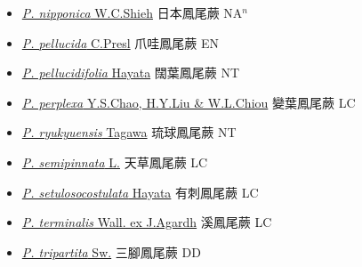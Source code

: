 \begin{itemize}
\begin{itemize}
        \item[] \href{http://www.theplantlist.org/tpl1.1/search?q=Pteris+nipponica}{\textit{P. nipponica} W.C.Shieh}   日本鳳尾蕨 NA$^n$
        \item[] \href{http://www.theplantlist.org/tpl1.1/search?q=Pteris+pellucida}{\textit{P. pellucida} C.Presl}     爪哇鳳尾蕨 EN
        \item[] \href{http://www.theplantlist.org/tpl1.1/search?q=Pteris+pellucidifolia}{\textit{P. pellucidifolia} Hayata}   闊葉鳳尾蕨 NT
        \item[] \href{http://www.theplantlist.org/tpl1.1/search?q=Pteris+perplexa}{\textit{P. perplexa} Y.S.Chao, H.Y.Liu \& W.L.Chiou}   變葉鳳尾蕨 LC
        \item[] \href{http://www.theplantlist.org/tpl1.1/search?q=Pteris+ryukyuensis}{\textit{P. ryukyuensis} Tagawa}   琉球鳳尾蕨 NT
        \item[] \href{http://www.theplantlist.org/tpl1.1/search?q=Pteris+semipinnata}{\textit{P. semipinnata} L.}     天草鳳尾蕨 LC
        \item[] \href{http://www.theplantlist.org/tpl1.1/search?q=Pteris+setulosocostulata}{\textit{P. setulosocostulata} Hayata}   有刺鳳尾蕨 LC
        \item[] \href{http://www.theplantlist.org/tpl1.1/search?q=Pteris+terminalis}{\textit{P. terminalis} Wall. ex J.Agardh}     溪鳳尾蕨 LC
        \item[] \href{http://www.theplantlist.org/tpl1.1/search?q=Pteris+tripartita}{\textit{P. tripartita} Sw.}   三腳鳳尾蕨 DD

\end{itemize}
\end{itemize}
